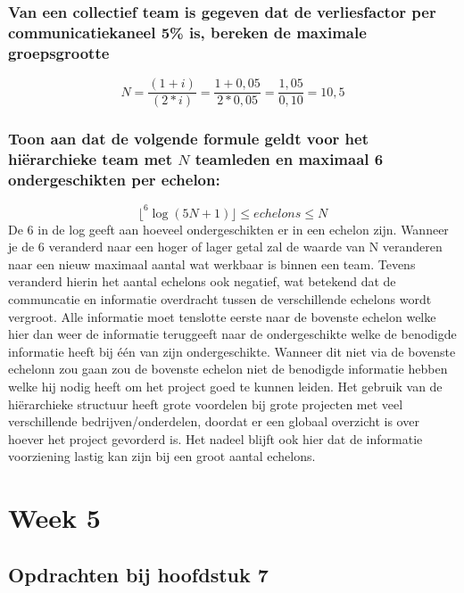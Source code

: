 \documentclass[a4paper,titlepage]{artikel1}
\begin{document}
   \subsubsection[Opdracht 3]{Van een collectief team is gegeven dat de verliesfactor per communicatiekaneel 5\% is, bereken de maximale groepsgrootte}
   \begin{displaymath}
     N=\frac{(1+i)}{(2*i)}=\frac{1+0,05}{2*0,05}=\frac{1,05}{0,10}=10,5
   \end{displaymath}

   \subsubsection[Opdracht 4]{Toon aan dat de volgende formule geldt voor het hi\"{e}rarchieke team met $N$ teamleden en maximaal 6 ondergeschikten per echelon:}
   \begin{displaymath}
     \lfloor^6\log{(5N+1)}\rfloor\leq echelons\leq N
   \end{displaymath}
   De $6$ in de log geeft aan hoeveel ondergeschikten er in een echelon zijn. Wanneer je de $6$ veranderd naar een hoger of lager getal zal de waarde van N veranderen naar een nieuw maximaal aantal wat werkbaar is binnen een team. Tevens veranderd hierin het aantal echelons ook negatief, wat betekend dat de communcatie en informatie overdracht tussen de verschillende echelons wordt vergroot. Alle informatie moet tenslotte eerste naar de bovenste echelon welke hier dan weer de informatie teruggeeft naar de ondergeschikte welke de benodigde informatie heeft bij \'{e}\'{e}n van zijn ondergeschikte. Wanneer dit niet via de bovenste echelonn zou gaan zou de bovenste echelon niet de benodigde informatie hebben welke hij nodig heeft om het project goed te kunnen leiden. Het gebruik van de hi\"{e}rarchieke structuur heeft grote voordelen bij grote projecten met veel verschillende bedrijven/onderdelen, doordat er een globaal overzicht is over hoever het project gevorderd is. Het nadeel blijft ook hier dat de informatie voorziening lastig kan zijn bij een groot aantal echelons.
   \section{Week 5}
   \subsection{Opdrachten bij hoofdstuk 7}
\end{document}

